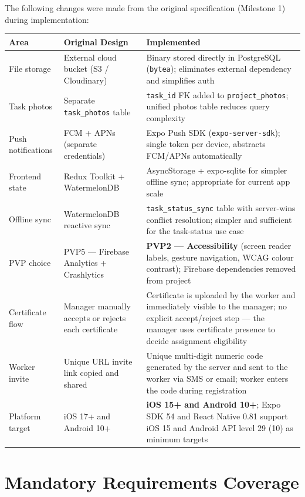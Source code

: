 \documentclass[12pt,a4paper]{article}
\begin{document}
The following changes were made from the original specification (Milestone 1) during implementation:

\begin{tabularx}{\textwidth}{|l|X|X|}
\hline
\textbf{Area} & \textbf{Original Design} & \textbf{Implemented} \\
\hline
File storage & External cloud bucket (S3 / Cloudinary) & Binary stored directly in PostgreSQL (\texttt{bytea}); eliminates external dependency and simplifies auth \\
\hline
Task photos & Separate \texttt{task\_photos} table & \texttt{task\_id} FK added to \texttt{project\_photos}; unified photos table reduces query complexity \\
\hline
Push notifications & FCM + APNs (separate credentials) & Expo Push SDK (\texttt{expo-server-sdk}); single token per device, abstracts FCM/APNs automatically \\
\hline
Frontend state & Redux Toolkit + WatermelonDB & AsyncStorage + expo-sqlite for simpler offline sync; appropriate for current app scale \\
\hline
Offline sync & WatermelonDB reactive sync & \texttt{task\_status\_sync} table with server-wins conflict resolution; simpler and sufficient for the task-status use case \\
\hline
PVP choice & PVP5 --- Firebase Analytics + Crashlytics & \textbf{PVP2 --- Accessibility} (screen reader labels, gesture navigation, WCAG colour contrast); Firebase dependencies removed from project \\
\hline
Certificate flow & Manager manually accepts or rejects each certificate & Certificate is uploaded by the worker and immediately visible to the manager; no explicit accept/reject step --- the manager uses certificate presence to decide assignment eligibility \\
\hline
Worker invite & Unique URL invite link copied and shared & Unique multi-digit numeric code generated by the server and sent to the worker via SMS or email; worker enters the code during registration \\
\hline
Platform target & iOS 17+ and Android 10+ & \textbf{iOS 15+ and Android 10+}; Expo SDK 54 and React Native 0.81 support iOS 15 and Android API level 29 (10) as minimum targets \\
\hline
\end{tabularx}

\section{Mandatory Requirements Coverage}
\end{document}
